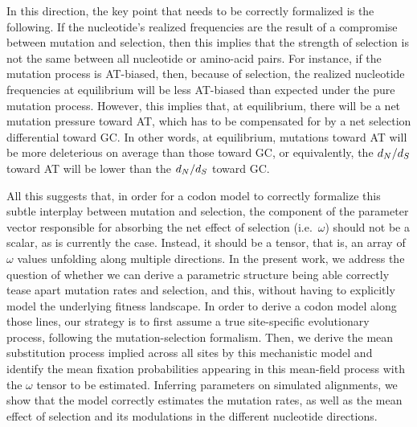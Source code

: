 In this direction, the key point that needs to be correctly formalized is the following.
If the nucleotide's realized frequencies are the result of a compromise between mutation and selection, then this implies that the strength of selection is not the same between all nucleotide or amino-acid pairs.
For instance, if the mutation process is AT-biased, then, because of selection, the realized nucleotide frequencies at equilibrium will be less AT-biased than expected under the pure mutation process.
However, this implies that, at equilibrium, there will be a net mutation pressure toward AT, which has to be compensated for by a net selection differential toward GC.
In other words, at equilibrium, mutations toward AT will be more deleterious on average than those toward GC, or equivalently, the $d_N / d_S$ toward AT will be lower than the $d_N / d_S$ toward GC.

All this suggests that, in order for a \gls{codon} model to correctly formalize this subtle interplay between mutation and selection, the component of the parameter vector responsible for absorbing the net effect of selection (i.e.~$\omega$) should not be a scalar, as is currently the case.
Instead, it should be a tensor, that is, an array of $\omega$ values unfolding along multiple directions.
In the present work, we address the question of whether we can derive a parametric structure being able correctly tease apart mutation rates and selection, and this, without having to explicitly model the underlying fitness landscape.
In order to derive a \gls{codon} model along those lines, our strategy is to first assume a true site-specific evolutionary process, following the mutation-selection formalism.
Then, we derive the mean \gls{substitution} process implied across all sites by this mechanistic model and identify the mean fixation probabilities appearing in this mean-field process with the $\omega$ tensor to be estimated.
Inferring parameters on simulated alignments, we show that the model correctly estimates the mutation rates, as well as the mean effect of selection and its modulations in the different nucleotide directions.



